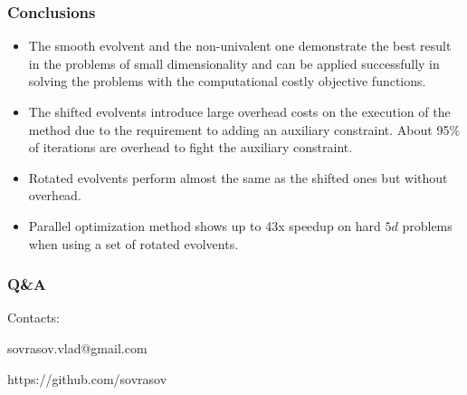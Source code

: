\documentclass[aspectratio=1610]{beamer}
\newcommand\unnumbered{\setbeamertemplate{footline}{}}
\begin{document}
\begin{frame}
  \frametitle{Conclusions}
    \begin{itemize}
      \item The smooth evolvent and the non-univalent one demonstrate the best result in the problems of small dimensionality and can be applied successfully in solving the problems with the computational costly objective functions.
      \item The shifted evolvents introduce large overhead costs on the execution of the method due to the requirement to adding an auxiliary constraint. About 95\% of iterations are overhead to fight the auxiliary constraint.
      \item Rotated evolvents perform almost the same as the shifted ones but without overhead.
      \item Parallel optimization method shows up to 43x speedup on hard \(5d\) problems when using a set of rotated evolvents.
    \end{itemize}
\end{frame}
{
\unnumbered
\begin{frame}{{}}
  \frametitle{Q\&A}
  \begin{center}
    \Large{Contacts:}
\vspace{0.5cm}

    sovrasov.vlad@gmail.com

    https://github.com/sovrasov
  \end{center}
\end{frame}
}
\end{document}
